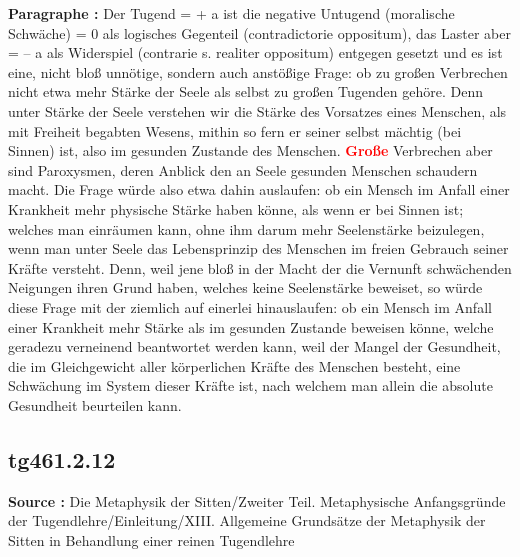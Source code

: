 \documentclass[a4paper,12pt,twoside]{book}
\newcommand{\match}[1]{\textcolor{red}{\textbf{#1}}}
\begin{document}
	\textbf{Paragraphe : }Der Tugend = + a ist die negative Untugend (moralische Schwäche) = 0 als logisches Gegenteil (contradictorie oppositum), das Laster aber = – a als Widerspiel (contrarie s. realiter oppositum) entgegen gesetzt und es ist eine, nicht bloß unnötige, sondern auch anstößige Frage: ob zu großen Verbrechen nicht etwa mehr Stärke der Seele als selbst zu großen Tugenden gehöre. Denn unter Stärke der Seele verstehen wir die Stärke des Vorsatzes eines Menschen, als mit Freiheit begabten Wesens, mithin so fern er seiner selbst mächtig (bei Sinnen) ist, also im gesunden Zustande des Menschen. \match{Große} Verbrechen aber sind Paroxysmen, deren Anblick den an Seele gesunden Menschen schaudern macht. Die Frage würde also etwa dahin auslaufen: ob ein Mensch im Anfall einer Krankheit mehr physische Stärke haben könne, als wenn er bei Sinnen ist; welches  man einräumen kann, ohne ihm darum mehr Seelenstärke beizulegen, wenn man unter Seele das Lebensprinzip des Menschen im freien Gebrauch seiner Kräfte versteht. Denn, weil jene bloß in der Macht der die Vernunft schwächenden Neigungen ihren Grund haben, welches keine Seelenstärke beweiset, so würde diese Frage mit der ziemlich auf einerlei hinauslaufen: ob ein Mensch im Anfall einer Krankheit mehr Stärke als im gesunden Zustande beweisen könne, welche geradezu verneinend beantwortet werden kann, weil der Mangel der Gesundheit, die im Gleichgewicht aller körperlichen Kräfte des Menschen besteht, eine Schwächung im System dieser Kräfte ist, nach welchem man allein die absolute Gesundheit beurteilen kann. 
	
	\subsection*{tg461.2.12} 
	\textbf{Source : }Die Metaphysik der Sitten/Zweiter Teil. Metaphysische Anfangsgründe der Tugendlehre/Einleitung/XIII. Allgemeine Grundsätze der Metaphysik der Sitten in Behandlung einer reinen Tugendlehre\\  
	
\end{document}
